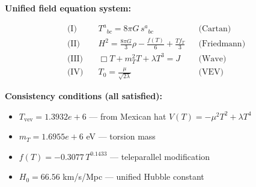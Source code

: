 
\textbf{Unified field equation system:}

\begin{align}
  \text{(I)} \quad & T^a{}_{bc} = 8\pi G \, s^a{}_{bc} && \text{(Cartan)} \\
  \text{(II)} \quad & H^2 = \frac{8\pi G}{3}\rho - \frac{f(T)}{6} + \frac{Tf_T}{3} && \text{(Friedmann)} \\
  \text{(III)} \quad & \Box T + m_T^2 T + \lambda T^3 = J && \text{(Wave)} \\
  \text{(IV)} \quad & T_0 = \frac{\mu}{\sqrt{2\lambda}} && \text{(VEV)}
\end{align}

\textbf{Consistency conditions (all satisfied):}
\begin{itemize}
  \item $T_{\text{vev}} = 1.3932e+6$ — from Mexican hat $V(T) = -\mu^2 T^2 + \lambda T^4$
  \item $m_T = 1.6955e+6$ eV — torsion mass
  \item $f(T) = -0.3077 \, T^{0.1433}$ — teleparallel modification
  \item $H_0 = 66.56$ km/s/Mpc — unified Hubble constant
\end{itemize}